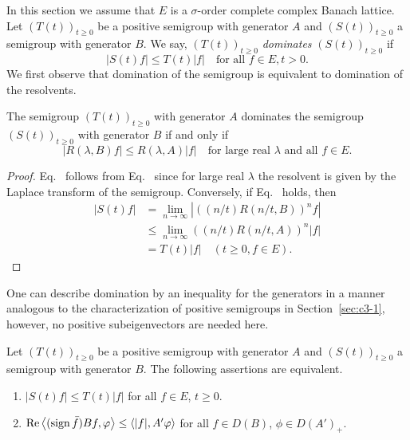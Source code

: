 In this section we assume that $E$ is a $\sigma$-order complete complex Banach lattice. 
Let $(T(t))_{t \geq 0}$ be a positive semigroup with generator $A$ and $(S(t))_{t \geq 0}$ a semigroup with generator $B$. 
We say, $(T(t))_{t \geq 0}$ \emph{dominates} $(S(t))_{t \geq 0}$ if
\begin{equation}\label{eq:c2-4.1}
|S(t)f| \leq T(t)|f| \quad \text{for all } f \in E, t > 0.
\end{equation}
We first observe that domination of the semigroup is equivalent to domination of the resolvents.
\begin{proposition}\label{prop:c2-4.1}
The semigroup $(T(t))_{t \geq 0}$ with generator $A$ dominates the semigroup $(S(t))_{t \geq 0}$ with generator $B$ if and only if
\begin{equation}\label{eq:c2-4.2}
|R(\lambda,B)f| \leq R(\lambda,A)|f| %
\quad \text{for large real }  \lambda  \text{ and all } f \in E .
\end{equation}
\end{proposition}
\begin{proof}
Eq.~ follows from Eq.~ since for large real $\lambda$ the resolvent is given by the Laplace transform of the semigroup. 
Conversely, if Eq.~ holds, then
\begin{align*}
|S(t)f| &= \lim_{n \to \infty} |((n/t)R(n/t,B))^{n}f|\\
&\leq \lim_{n \to \infty} ((n/t)R(n/t,A))^{n}|f|\\
&= T(t)|f| \quad (t \geq 0, f \in E).
\tag*{\qedsymbol}%
\end{align*}
\let\qedsymbol\relax
\end{proof}
One can describe domination by an inequality for the generators in a manner analogous to the characterization of positive semigroups in Section~\ref{sec:c3-1}, however, no positive subeigenvectors are needed here.
\begin{theorem}\label{thm:c2-4.2}
Let $(T(t))_{t \geq 0}$ be a positive semigroup with generator $A$ and $(S(t))_{t \geq 0}$ a semigroup with generator $B$. The following assertions are equivalent.
\begin{enumerate}[\upshape (a)]
\item \label{thm:c2-4.2-1}
$|S(t)f| \leq T(t)|f|$ for all $f \in E$, $t \geq 0$.
\item \label{thm:c2-4.2-2}
$\Re\left\langle(\sign  \bar{f}) Bf,\phi\right\rangle \leq \langle|f|,A'\phi\rangle$ for all $f \in D(B)$, $\phi \in D(A')_{+}$.
\end{enumerate}
\end{theorem}
